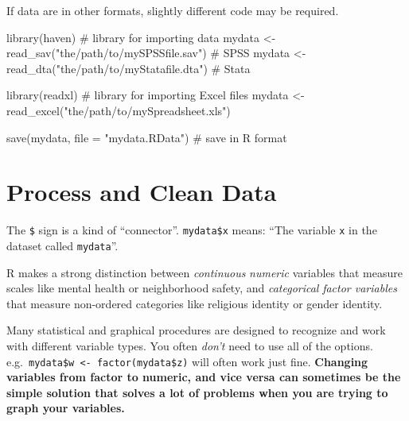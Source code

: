 \documentclass[
  letterpaper,
  DIV=11,
  numbers=noendperiod]{scrreprt}
\newenvironment{Shaded}{\begin{snugshade}}{\end{snugshade}}
\newcommand{\AttributeTok}[1]{\textcolor[rgb]{0.40,0.45,0.13}{#1}}
\newcommand{\CommentTok}[1]{\textcolor[rgb]{0.37,0.37,0.37}{#1}}
\newcommand{\ConstantTok}[1]{\textcolor[rgb]{0.56,0.35,0.01}{#1}}
\newcommand{\DecValTok}[1]{\textcolor[rgb]{0.68,0.00,0.00}{#1}}
\newcommand{\FunctionTok}[1]{\textcolor[rgb]{0.28,0.35,0.67}{#1}}
\newcommand{\NormalTok}[1]{\textcolor[rgb]{0.00,0.23,0.31}{#1}}
\newcommand{\OtherTok}[1]{\textcolor[rgb]{0.00,0.23,0.31}{#1}}
\newcommand{\SpecialCharTok}[1]{\textcolor[rgb]{0.37,0.37,0.37}{#1}}
\newcommand{\StringTok}[1]{\textcolor[rgb]{0.13,0.47,0.30}{#1}}
\begin{document}
If data are in other formats, slightly different code may be required.

\begin{Shaded}
\begin{Highlighting}[]
\FunctionTok{library}\NormalTok{(haven) }\CommentTok{\# library for importing data }
\NormalTok{mydata }\OtherTok{\textless{}{-}} \FunctionTok{read\_sav}\NormalTok{(}\StringTok{"the/path/to/mySPSSfile.sav"}\NormalTok{) }\CommentTok{\# SPSS}
\NormalTok{mydata }\OtherTok{\textless{}{-}} \FunctionTok{read\_dta}\NormalTok{(}\StringTok{"the/path/to/myStatafile.dta"}\NormalTok{) }\CommentTok{\# Stata}

\FunctionTok{library}\NormalTok{(readxl) }\CommentTok{\# library for importing Excel files}
\NormalTok{mydata }\OtherTok{\textless{}{-}} \FunctionTok{read\_excel}\NormalTok{(}\StringTok{"the/path/to/mySpreadsheet.xls"}\NormalTok{)}

\FunctionTok{save}\NormalTok{(mydata, }\AttributeTok{file =} \StringTok{"mydata.RData"}\NormalTok{) }\CommentTok{\# save in R format}
\end{Highlighting}
\end{Shaded}

\hypertarget{process-and-clean-data}{%
\section{Process and Clean Data}\label{process-and-clean-data}}

The \texttt{\$} sign is a kind of ``connector''. \texttt{mydata\$x}
means: ``The variable \texttt{x} in the dataset called
\texttt{mydata}''.

\begin{Shaded}
\end{Shaded}

R makes a strong distinction between \emph{continuous} \emph{numeric}
variables that measure scales like mental health or neighborhood safety,
and \emph{categorical} \emph{factor variables} that measure non-ordered
categories like religious identity or gender identity.

Many statistical and graphical procedures are designed to recognize and
work with different variable types. You often \emph{don't} need to use
all of the options.
e.g.~\texttt{mydata\$w\ \textless{}-\ factor(mydata\$z)} will often work
just fine. \textbf{Changing variables from factor to numeric, and vice
versa can sometimes be the simple solution that solves a lot of problems
when you are trying to graph your variables.}
\end{document}
